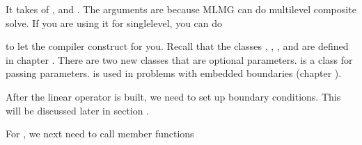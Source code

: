 \documentclass[letterpaper,10pt,english]{sphinxmanual}
\begin{document}
\sphinxAtStartPar
It takes  of ,  and
.  The arguments are  because MLMG can
do multi\sphinxhyphen{}level composite solve.  If you are using it for single\sphinxhyphen{}level,
you can do

\begin{sphinxVerbatim}[commandchars=\\\{\}]
   
\end{sphinxVerbatim}

\sphinxAtStartPar
to let the compiler construct  for you.  Recall that the
classes , , , and
 are defined in chapter {\hyperref[\detokenize{Basics_Chapter:chap-basics}]{}}.  There are
two new classes that are optional parameters.   is a
class for passing parameters.   is used in problems
with embedded boundaries (chapter {\hyperref[\detokenize{EB_Chapter:chap-eb}]{}}).

\sphinxAtStartPar
After the linear operator is built, we need to set up boundary
conditions.  This will be discussed later in section
{\hyperref[\detokenize{LinearSolvers:sec-linearsolver-bc}]{}}.

\sphinxAtStartPar
For , we next need to call member functions

\begin{sphinxVerbatim}[commandchars=\\\{\}]
     
      
       
\end{sphinxVerbatim}
\end{document}
